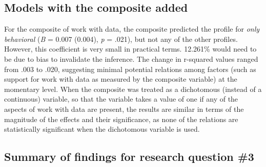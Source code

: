 \documentclass[]{book}
\theoremstyle{definition}
\theoremstyle{definition}
\theoremstyle{definition}
\theoremstyle{remark}
\begin{document}
\subsection{Models with the composite
added}\label{models-with-the-composite-added}

For the composite of work with data, the composite predicted the profile
for \emph{only behavioral} (\emph{B} = 0.007 (0.004), \emph{p} = .021),
but not any of the other profiles. However, this coefficient is very
small in practical terms. 12.261\% would need to be due to bias to
invalidate the inference. The change in r-squared values ranged from
.003 to .020, suggesting minimal potential relations among factors (such
as support for work with data as measured by the composite variable) at
the momentary level. When the composite was treated as a dichotomous
(instead of a continuous) variable, so that the variable takes a value
of one if any of the aspects of work with data are present, the results
are similar in terms of the magnitude of the effects and their
significance, as none of the relations are statistically significant
when the dichotomous variable is used.

\begin{table}

\caption{\label{tab:unnamed-chunk-12}Results of mixed effects models for the composite}
\centering
{}
\end{table}

\subsection{Summary of findings for research question
\#3}\label{summary-of-findings-for-research-question-3}
\end{document}
